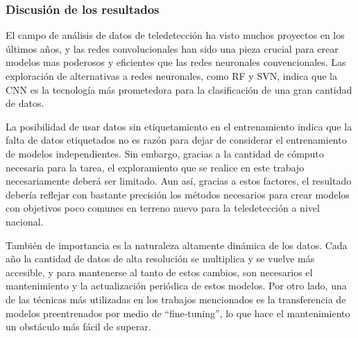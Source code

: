 \subsubsection*{Discusión de los resultados}

El campo de análisis de datos de teledetección ha visto muchos proyectos en los últimos años, y las redes
convolucionales han sido una pieza crucial para crear modelos mas poderosos y eficientes que las redes neuronales
convencionales. Las exploración de alternativas a redes neuronales, como RF y SVN, indica que la CNN es la tecnología
más prometedora para la clasificación de una gran cantidad de datos.

La posibilidad de usar datos sin etiquetamiento en el entrenamiento indica que la falta de datos etiquetados no es
razón para dejar de considerar el entrenamiento de modelos independientes. Sin embargo, gracias a la cantidad de
cómputo necesaria para la tarea, el exploramiento que se realice en este trabajo necesariamente deberá ser limitado.
Aun así, gracias a estos factores, el resultado debería reflejar con bastante precisión los métodos necesarios para
crear modelos con objetivos poco comunes en terreno nuevo para la teledetección a nivel nacional.

También de importancia es la naturaleza altamente dinámica de los datos. Cada año la cantidad de datos de alta
resolución se multiplica y se vuelve más accesible, y para mantenerse al tanto de estos cambios, son necesarios el
mantenimiento y la actualización periódica de estos modelos. Por otro lado, una de las técnicas más utilizadas en los
trabajos mencionados es la transferencia de modelos preentrenados por medio de \enquote{fine-tuning}, lo que hace el
mantenimiento un obstáculo más fácil de superar.

